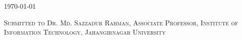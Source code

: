 \begin{titlepage}
\textsc{{\large \today}}\\[2cm] %


\vfill

\textsc{\normalsize Submitted to Dr. Md. Sazzadur Rahman, Associate Professor, Institute of Information Technology, Jahangirnagar University \\
\degree}

\vfill %

\end{titlepage}